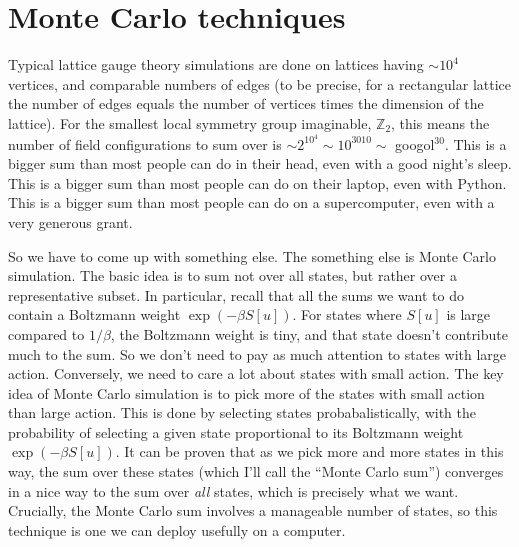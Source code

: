 \documentclass[9pt,twocolumn,twoside]{article}
\begin{document}
\section{Monte Carlo techniques}
Typical lattice gauge theory simulations are done on lattices having $\sim 10^4$ vertices, and comparable numbers of edges (to be precise, for a rectangular lattice the number of edges equals the number of vertices times the dimension of the lattice).  For the smallest local symmetry group imaginable, $\mathbb{Z}_2$, this means the number of field configurations to sum over is $\sim 2^{10^4}\sim 10^{3010}\sim$ googol$^{30}$.  This is a bigger sum than most people can do in their head, even with a good night's sleep.  This is a bigger sum than most people can do on their laptop, even with Python.  This is a bigger sum than most people can do on a supercomputer, even with a very generous grant.  

So we have to come up with something else.  The something else is Monte Carlo simulation.  The basic idea is to sum not over all states, but rather over a representative subset.  In particular, recall that all the sums we want to do contain a Boltzmann weight $\exp(-\beta S[u])$.  For states where $S[u]$ is large compared to $1/\beta$, the Boltzmann weight is tiny, and that state doesn't contribute much to the sum.  So we don't need to pay as much attention to states with large action.  Conversely, we need to care a lot about states with small action.  The key idea of Monte Carlo simulation is to pick more of the states with small action than large action.  This is done by selecting states probabalistically, with the probability of selecting a given state proportional to its Boltzmann weight $\exp(-\beta S[u])$.  It can be proven that as we pick more and more states in this way, the sum over these states (which I'll call the ``Monte Carlo sum'') converges in a nice way to the sum over \textit{all} states, which is precisely what we want.  Crucially, the Monte Carlo sum involves a manageable number of states, so this technique is one we can deploy usefully on a computer. 
\end{document}
